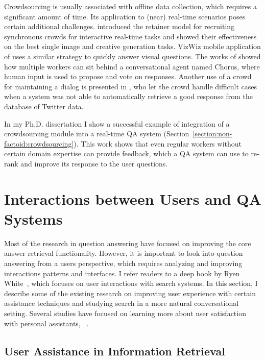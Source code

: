 Crowdsourcing is usually associated with offline data collection, which requires a significant amount of time.
Its application to (near) real-time scenarios poses certain additional challenges.
\cite{bernstein2011crowds} introduced the retainer model for recruiting synchronous crowds for interactive real-time tasks and showed their effectiveness on the best single image and creative generation tasks.
VizWiz mobile application of \cite{bigham2010vizwiz} uses a similar strategy to quickly answer visual questions.
The works of \cite{huang2016there,huang2015guardian,Lasecki:2013:CCC:2501988.2502057} showed how multiple workers can sit behind a conversational agent named Chorus, where human input is used to propose and vote on responses.
Another use of a crowd for maintaining a dialog is presented in \cite{Bessho:2012:DSU:2392800.2392841}, who let the crowd handle difficult cases when a system was not able to automatically retrieve a good response from the database of Twitter data.

In my Ph.D. dissertation I show a successful example of integration of a crowdsourcing module into a real-time QA system (Section~\ref{section:non-factoid:crowdsourcing}).
This work shows that even regular workers without certain domain expertise can provide feedback, which a QA system can use to re-rank and improve its response to the user questions.

\section{Interactions between Users and QA Systems}
\label{section:relatedwork:user}

Most of the research in question answering have focused on improving the core answer retrieval functionality.
However, it is important to look into question answering from a users perspective, which requires analyzing and improving interactions patterns and interfaces.
I refer readers to a deep book by Ryen White~\cite{white2016interactions}, which focuses on user interactions with search systems.
In this section, I describe some of the existing research on improving user experience with certain assistance techniques and studying search in a more natural conversational setting.
Several studies have focused on learning more about user satisfaction with personal assistants, \eg~\cite{kiseleva2016understanding,Liu:2008:PIS:1390334.1390417,ong2009measurement}.

\subsection{User Assistance in Information Retrieval}
\label{section:relatedwork:conversation:user-assist}

